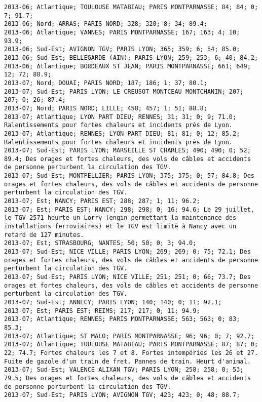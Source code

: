 \documentclass{article}
\begin{document}
\begin{Verbatim}[commandchars=\\\{\}]
2013-06; Atlantique; TOULOUSE MATABIAU; PARIS MONTPARNASSE; 84; 84; 0; 7; 91.7; 
2013-06; Nord; ARRAS; PARIS NORD; 328; 320; 8; 34; 89.4; 
2013-06; Atlantique; VANNES; PARIS MONTPARNASSE; 167; 163; 4; 10; 93.9; 
2013-06; Sud-Est; AVIGNON TGV; PARIS LYON; 365; 359; 6; 54; 85.0; 
2013-06; Sud-Est; BELLEGARDE (AIN); PARIS LYON; 259; 253; 6; 40; 84.2; 
2013-06; Atlantique; BORDEAUX ST JEAN; PARIS MONTPARNASSE; 661; 649; 12; 72; 88.9; 
2013-07; Nord; DOUAI; PARIS NORD; 187; 186; 1; 37; 80.1; 
2013-07; Sud-Est; PARIS LYON; LE CREUSOT MONTCEAU MONTCHANIN; 207; 207; 0; 26; 87.4; 
2013-07; Nord; PARIS NORD; LILLE; 458; 457; 1; 51; 88.8; 
2013-07; Atlantique; LYON PART DIEU; RENNES; 31; 31; 0; 9; 71.0; Ralentissements pour fortes chaleurs et incidents près de Lyon.
2013-07; Atlantique; RENNES; LYON PART DIEU; 81; 81; 0; 12; 85.2; Ralentissements pour fortes chaleurs et incidents près de Lyon.
2013-07; Sud-Est; PARIS LYON; MARSEILLE ST CHARLES; 490; 490; 0; 52; 89.4; Des orages et fortes chaleurs, des vols de câbles et accidents de personne perturbent la circulation des TGV.
2013-07; Sud-Est; MONTPELLIER; PARIS LYON; 375; 375; 0; 57; 84.8; Des orages et fortes chaleurs, des vols de câbles et accidents de personne perturbent la circulation des TGV.
2013-07; Est; NANCY; PARIS EST; 288; 287; 1; 11; 96.2; 
2013-07; Est; PARIS EST; NANCY; 298; 298; 0; 16; 94.6; Le 29 juillet, le TGV 2571 heurte un Lorry (engin permettant la maintenance des installations ferroviaires) et le TGV est limité à Nancy avec un retard de 127 minutes.
2013-07; Est; STRASBOURG; NANTES; 50; 50; 0; 3; 94.0; 
2013-07; Sud-Est; NICE VILLE; PARIS LYON; 269; 269; 0; 75; 72.1; Des orages et fortes chaleurs, des vols de câbles et accidents de personne perturbent la circulation des TGV.
2013-07; Sud-Est; PARIS LYON; NICE VILLE; 251; 251; 0; 66; 73.7; Des orages et fortes chaleurs, des vols de câbles et accidents de personne perturbent la circulation des TGV.
2013-07; Sud-Est; ANNECY; PARIS LYON; 140; 140; 0; 11; 92.1; 
2013-07; Est; PARIS EST; REIMS; 217; 217; 0; 11; 94.9; 
2013-07; Atlantique; RENNES; PARIS MONTPARNASSE; 563; 563; 0; 83; 85.3; 
2013-07; Atlantique; ST MALO; PARIS MONTPARNASSE; 96; 96; 0; 7; 92.7; 
2013-07; Atlantique; TOULOUSE MATABIAU; PARIS MONTPARNASSE; 87; 87; 0; 22; 74.7; Fortes chaleurs les 7 et 8. Fortes intempéries les 26 et 27. Fuite de gazole d'un train de fret. Pannes de train. Heurt d'animal.
2013-07; Sud-Est; VALENCE ALIXAN TGV; PARIS LYON; 258; 258; 0; 53; 79.5; Des orages et fortes chaleurs, des vols de câbles et accidents de personne perturbent la circulation des TGV.
2013-07; Sud-Est; PARIS LYON; AVIGNON TGV; 423; 423; 0; 48; 88.7; 

\end{Verbatim}
\end{document}
